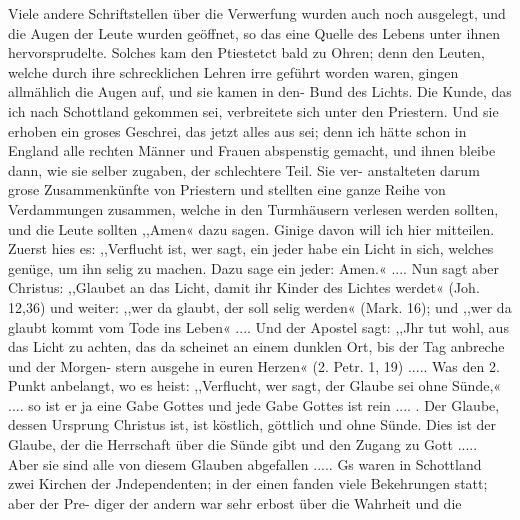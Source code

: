 Viele andere Schriftstellen über die Verwerfung wurden
auch noch ausgelegt, und die Augen der Leute wurden geöffnet,
so das eine Quelle des Lebens unter ihnen hervorsprudelte.
Solches kam den Ptiestetct bald zu Ohren; denn den Leuten,
welche durch ihre schrecklichen Lehren irre geführt worden waren,
gingen allmählich die Augen auf, und sie kamen in den- Bund
des Lichts. Die Kunde, das ich nach Schottland gekommen sei,
verbreitete sich unter den Priestern. Und sie erhoben ein groses
Geschrei, das jetzt alles aus sei; denn ich hätte schon in England
alle rechten Männer und Frauen abspenstig gemacht, und ihnen
bleibe dann, wie sie selber zugaben, der schlechtere Teil. Sie ver-
anstalteten darum grose Zusammenkünfte von Priestern und
stellten eine ganze Reihe von Verdammungen zusammen, welche
in den Turmhäusern verlesen werden sollten, und die Leute sollten
,,Amen« dazu sagen. Ginige davon will ich hier mitteilen. Zuerst
hies es: ,,Verflucht ist, wer sagt, ein jeder habe ein Licht in sich,
welches genüge, um ihn selig zu machen. Dazu sage ein jeder:
Amen.« .... Nun sagt aber Christus: ,,Glaubet an das Licht,
damit ihr Kinder des Lichtes werdet« (Joh. 12,36) und weiter:
,,wer da glaubt, der soll selig werden« (Mark. 16); und ,,wer
da glaubt kommt vom Tode ins Leben« .... Und der Apostel
sagt: ,,Jhr tut wohl, aus das Licht zu achten, das da scheinet
an einem dunklen Ort, bis der Tag anbreche und der Morgen-
stern ausgehe in euren Herzen« (2. Petr. 1, 19) ..... Was
den 2. Punkt anbelangt, wo es heist: ,,Verflucht, wer sagt, der
Glaube sei ohne Sünde,« .... so ist er ja eine Gabe Gottes
und jede Gabe Gottes ist rein .... . Der Glaube, dessen
Ursprung Christus ist, ist köstlich, göttlich und ohne Sünde. Dies
ist der Glaube, der die Herrschaft über die Sünde gibt und den
Zugang zu Gott ..... Aber sie sind alle von diesem Glauben
abgefallen .....
Gs waren in Schottland zwei Kirchen der Jndependenten;
in der einen fanden viele Bekehrungen statt; aber der Pre-
diger der andern war sehr erbost über die Wahrheit und die


